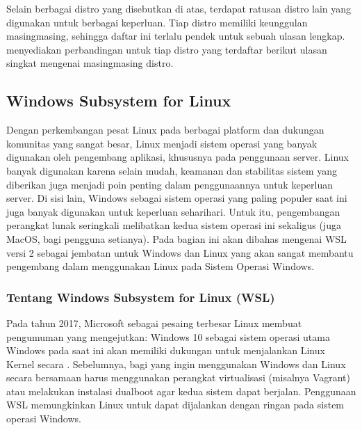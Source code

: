 \documentclass[letterpaper,10pt,english]{sphinxmanual}
\begin{document}

Selain berbagai distro yang disebutkan di atas, terdapat ratusan distro lain yang digunakan untuk berbagai keperluan. Tiap distro memiliki keunggulan masing\sphinxhyphen{}masing, sehingga daftar ini terlalu pendek untuk sebuah ulasan lengkap.  menyediakan perbandingan untuk tiap distro yang terdaftar berikut ulasan singkat mengenai masing\sphinxhyphen{}masing distro.


\subsection{Windows Subsystem for Linux}
\label{\detokenize{sesi1/pengantarlinux:windows-subsystem-for-linux}}
Dengan perkembangan pesat Linux pada berbagai platform dan dukungan komunitas yang sangat besar, Linux menjadi sistem operasi yang banyak digunakan oleh pengembang aplikasi, khususnya pada penggunaan server. Linux banyak digunakan karena selain mudah, keamanan dan stabilitas sistem yang diberikan juga menjadi poin penting dalam penggunaannya untuk keperluan server. Di sisi lain, Windows sebagai sistem operasi yang paling populer saat ini juga banyak digunakan untuk keperluan sehari\sphinxhyphen{}hari. Untuk itu, pengembangan perangkat lunak seringkali melibatkan kedua sistem operasi ini sekaligus (juga MacOS, bagi pengguna setianya). Pada bagian ini akan dibahas mengenai WSL versi 2 sebagai jembatan untuk Windows dan Linux yang akan sangat membantu pengembang dalam menggunakan Linux pada Sistem Operasi Windows.


\subsubsection{Tentang Windows Subsystem for Linux (WSL)}
\label{\detokenize{sesi1/pengantarlinux:tentang-windows-subsystem-for-linux-wsl}}
Pada tahun 2017, Microsoft sebagai pesaing terbesar Linux membuat pengumuman yang mengejutkan: Windows 10 sebagai sistem operasi utama Windows pada saat ini akan memiliki dukungan untuk menjalankan Linux Kernel secara . Sebelumnya, bagi  yang ingin menggunakan Windows dan Linux secara bersamaan harus menggunakan perangkat virtualisasi (misalnya Vagrant) atau melakukan instalasi dual\sphinxhyphen{}boot agar kedua sistem dapat berjalan. Penggunaan WSL memungkinkan Linux untuk dapat dijalankan dengan ringan pada sistem operasi Windows.
\end{document}
